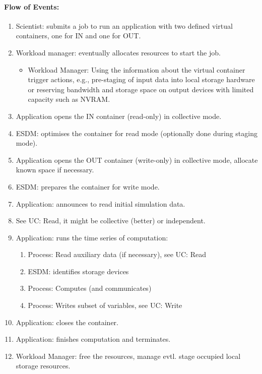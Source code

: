 

\paragraph{Flow of Events:}
\begin{enumerate}
	\item Scientist: submits a job to run an application with two defined virtual containers, one for IN and one for OUT.
	\item Workload manager: eventually allocates resources to start the job.
	  \begin{itemize}
	  \item Workload Manager: Using the information about the virtual container trigger actions, e.g., pre-staging of input data into local storage hardware or reserving bandwidth and storage space on output devices with limited capacity such as NVRAM.
	  \end{itemize}
	\item Application opens the IN container (read-only) in collective mode.
	\item ESDM: optimises the container for read mode (optionally done during staging mode).
	\item Application opens the OUT container (write-only) in collective mode, allocate known space if necessary.
	\item ESDM: prepares the container for write mode.
	\item Application: announces to read initial simulation data.
	\item See UC: Read, it might be collective (better) or independent.
	\item Application: runs the time series of computation:
	\begin{enumerate}
		\item Process: Read auxiliary data (if necessary), see UC: Read
		\item ESDM: identifies storage devices
		\item Process: Computes (and communicates)
		\item Process: Writes subset of variables, see UC: Write
	\end{enumerate}
	\item Application: closes the container.
	\item Application: finishes computation and terminates.
	\item Workload Manager: free the resources, manage evtl. stage occupied local storage resources.
\end{enumerate}


